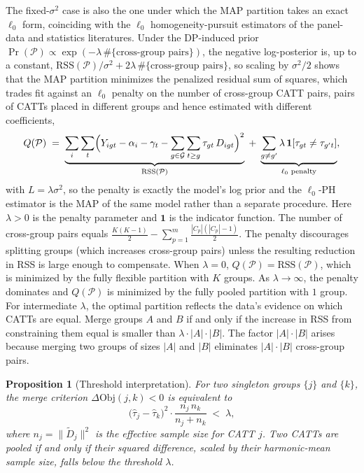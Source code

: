 \documentclass[margin=5in, 12pt]{article}
\newtheorem{proposition}{Proposition}
\newcommand{\1}{\mathbbm{1}}
\begin{document}
  The fixed-$\sigma^{2}$ case is also the one under which the MAP partition takes an exact $\ell_0$ form, coinciding with the $\ell_0$ homogeneity-pursuit estimators of the panel-data and statistics literatures. Under the DP-induced prior $\Pr(\mathcal{P}) \propto \exp(-\lambda\,\#\{\text{cross-group pairs}\})$, the negative log-posterior is, up to a constant, $\mathrm{RSS}(\mathcal{P})/\sigma^{2} + 2\lambda\,\#\{\text{cross-group pairs}\}$, so scaling by $\sigma^{2}/2$ shows that the MAP partition minimizes the penalized residual sum of squares, which trades fit against an $\ell_0$ penalty on the number of cross-group CATT pairs, pairs of CATTs placed in different groups and hence estimated with different coefficients,
  \begin{equation}
  Q(\mathcal{P}) \;=\; \underbrace{\sum_i \sum_t \Bigl(Y_{igt} - \alpha_i - \gamma_t - \sum_{g \in \mathcal{G}}\sum_{t \geq g}
  \tau_{gt}\, D_{igt}\Bigr)^2}_{\mathrm{RSS}(\mathcal{P})} \;+\; \underbrace{\sum_{g \neq g'} \lambda\,\mathbf{1}[\tau_{gt} \neq
  \tau_{g't}]}_{\ell_0 \text{ penalty}},
    \label{eq:l0obj}
  \end{equation}
  with $L = \lambda\sigma^{2}$, so the penalty is exactly the model's log prior and the $\ell_0$-PH estimator is the MAP of the same model rather than a separate procedure. Here $\lambda > 0$ is the penalty parameter and $\mathbf{1}$ is the indicator function. The number of
  cross-group pairs equals $\tfrac{K(K-1)}{2} - \sum_{p=1}^{m}\tfrac{|C_p|(|C_p|-1)}{2}$. The penalty discourages splitting
  groups (which increases cross-group pairs) unless the resulting reduction in RSS is large enough to compensate. When $\lambda =
   0$, $Q(\mathcal{P}) = \mathrm{RSS}(\mathcal{P})$, which is minimized by the fully flexible partition with $K$ groups. As
  $\lambda \to \infty$, the penalty dominates and $Q(\mathcal{P})$ is minimized by the fully pooled partition with $1$ group. For
   intermediate $\lambda$, the optimal partition reflects the data's evidence on which CATTs are equal. Merge groups $A$ and $B$
  if and only if the increase in RSS from constraining them equal is smaller than $\lambda \cdot |A| \cdot |B|$. The factor $|A|
  \cdot |B|$ arises because merging two groups of sizes $|A|$ and $|B|$ eliminates $|A| \cdot |B|$ cross-group pairs.

  \begin{proposition}[Threshold interpretation]
  \label{prop:threshold}
  For two singleton groups $\{j\}$ and $\{k\}$, the merge criterion $\Delta\mathrm{Obj}(j,k) < 0$ is equivalent to
  \begin{equation}
    \bigl(\hat{\tau}_j - \hat{\tau}_k\bigr)^2 \cdot \frac{n_j\, n_k}{n_j + n_k} \;<\; \lambda,
    \label{eq:threshold}
  \end{equation}
  where $n_j = \|\tilde{D}_j\|^2$ is the effective sample size for CATT $j$. Two CATTs are pooled if and only if their squared
  difference, scaled by their harmonic-mean sample size, falls below the threshold $\lambda$.
  \end{proposition}
\end{document}
